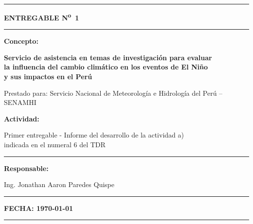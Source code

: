 \documentclass[11pt,a4paper]{article}
\begin{document}

\begin{titlepage}
\centering
\noindent\rule{\textwidth}{0.6pt}

\vspace{1.2cm}
{\Large \bfseries ENTREGABLE N\textsuperscript{o}~1 \par}
\vspace{1.2cm}
\rule{0.7\textwidth}{0.6pt}

\vspace{1.2cm}
{\normalsize \bfseries Concepto: \par}
\vspace{0.3cm}
{\large \bfseries Servicio de asistencia en temas de investigaci\'on para evaluar\\
la influencia del cambio clim\'atico en los eventos de El Ni\~no\\
y sus impactos en el Per\'u \par}

\vspace{1.4cm}
{\small Prestado para: Servicio Nacional de Meteorolog\'ia e Hidrolog\'ia del Per\'u -- SENAMHI \par}

\vspace{1.4cm}
{\normalsize \bfseries Actividad: \par}
\vspace{0.2cm}
{\normalsize Primer entregable - Informe del desarrollo de la actividad a)\\
indicada en el numeral 6 del TDR \par}

\vspace{1.2cm}
\rule{0.7\textwidth}{0.6pt}

\vspace{0.3cm}
{\small \bfseries Responsable: \par}
\vspace{0.2cm}
{\small Ing. Jonathan Aaron Paredes Quispe \par}
\vspace{0.3cm}
\rule{0.7\textwidth}{0.6pt}

\vfill
{\small \bfseries FECHA: \today \par}
\vspace{0.6cm}
\noindent\rule{\textwidth}{0.6pt}
\end{titlepage}
\end{document}
